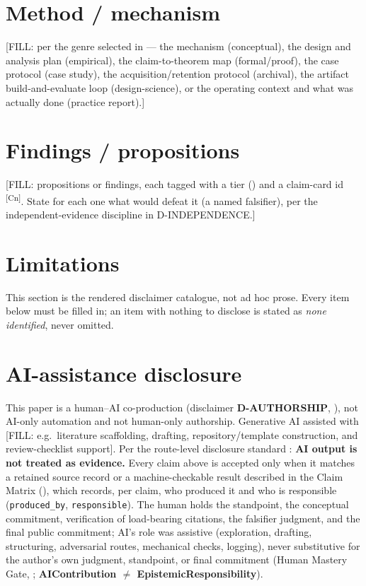 \documentclass[11pt]{article}
\newcommand{\claimref}[1]{\textsuperscript{[#1]}}
\begin{document}
\section{Method / mechanism}
\label{sec:method}
[FILL: per the genre selected in  --- the mechanism
(conceptual), the design and analysis plan (empirical), the claim-to-theorem
map (formal/proof), the case protocol (case study), the acquisition/retention
protocol (archival), the artifact build-and-evaluate loop (design-science),
or the operating context and what was actually done (practice report).]

\section{Findings / propositions}
\label{sec:findings}
[FILL: propositions or findings, each tagged with a tier ()
and a claim-card id \claimref{Cn}. State for each one what would defeat it
(a named falsifier), per the independent-evidence discipline in
D-INDEPENDENCE.]

\section{Limitations}
\label{sec:limitations}
\label{sec:disclaimers}
This section is the rendered disclaimer catalogue,
not ad hoc prose. Every item below must be filled in; an item with nothing to
disclose is stated as \emph{none identified}, never omitted.



\section{AI-assistance disclosure}
\label{sec:ai-disclosure}
This paper is a human--AI co-production (disclaimer \textbf{D-AUTHORSHIP},
), not AI-only automation and not human-only
authorship. Generative AI assisted with [FILL: e.g.\ literature scaffolding,
drafting, repository/template construction, and review-checklist support].
Per the route-level disclosure standard \citep{lahtee2026zeroreadout}:
\textbf{AI output is not treated as evidence.} Every claim above is accepted
only when it matches a retained source record or a machine-checkable result
described in the Claim Matrix (), which records, per
claim, who produced it and who is responsible (\texttt{produced\_by},
\texttt{responsible}). The human holds the standpoint, the conceptual
commitment, verification of load-bearing citations, the falsifier judgment,
and the final public commitment; AI's role was assistive (exploration,
drafting, structuring, adversarial routes, mechanical checks, logging),
never substitutive for the author's own judgment, standpoint, or final
commitment (Human Mastery Gate, ;
\textbf{AIContribution $\neq$ EpistemicResponsibility}).
\end{document}
